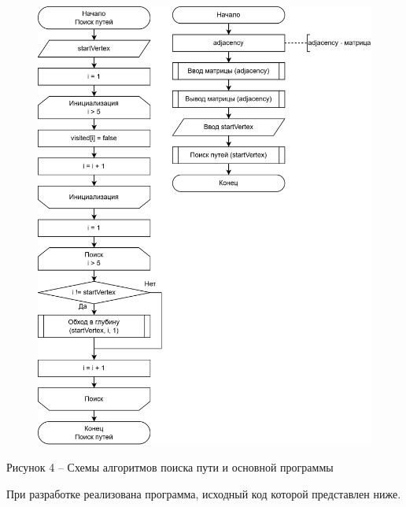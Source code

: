 \documentclass[a4paper,14pt]{extarticle}
\begin{document}
  \begin{figure}[h]
    \centering
    \includegraphics[width=0.89\linewidth]{images/s-3.png}
  \end{figure}
  \begin{center}
    Рисунок 4 – Схемы алгоритмов поиска пути и основной программы
  \end{center}

  \pagebreak
  При разработке реализована программа, исходный код которой представлен ниже.

  \begingroup
    \linespread{1}
\end{document}
